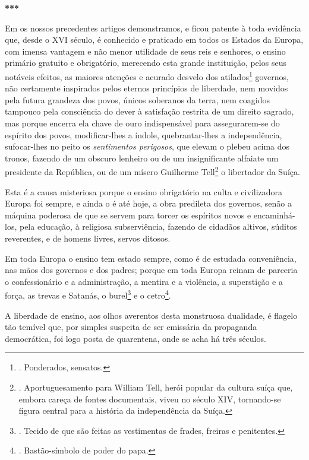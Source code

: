 \textbf{***}

Em os nossos precedentes artigos demonstramos, e ficou patente à toda
evidência que, desde o XVI século, é conhecido e praticado em todos os
Estados da Europa, com imensa vantagem e não menor utilidade de seus
reis e senhores, o ensino primário gratuito e obrigatório, merecendo
esta grande instituição, pelos seus notáveis efeitos, as maiores
atenções e acurado desvelo dos atilados\footnote{. Ponderados, sensatos.}
governos, não certamente inspirados pelos eternos princípios de
liberdade, nem movidos pela futura grandeza dos povos, únicos soberanos
da terra, nem coagidos tampouco pela consciência do dever à satisfação
restrita de um direito sagrado, mas porque encerra ela chave de ouro
indispensável para assegurarem-se do espírito dos povos, modificar-lhes
a índole, quebrantar-lhes a independência, sufocar-lhes no peito os
\emph{sentimentos perigosos}, que elevam o plebeu acima dos tronos,
fazendo de um obscuro lenheiro ou de um insignificante alfaiate um
presidente da República, ou de um mísero Guilherme Tell\footnote{.
  Aportuguesamento para William Tell, herói popular da cultura suíça
  que, embora careça de fontes documentais, viveu no século XIV,
  tornando-se figura central para a história da independência da Suíça.}
o libertador da Suíça.

Esta é a causa misteriosa porque o ensino obrigatório na culta e
civilizadora Europa foi sempre, e ainda o é até hoje, a obra predileta
dos governos, senão a máquina poderosa de que se servem para torcer os
espíritos novos e encaminhá-los, pela educação, à religiosa
subserviência, fazendo de cidadãos altivos, súditos reverentes, e de
homens livres, servos ditosos.

Em toda Europa o ensino tem estado sempre, como é de estudada
conveniência, nas mãos dos governos e dos padres; porque em toda Europa
reinam de parceria o confessionário e a administração, a mentira e a
violência, a superstição e a força, as trevas e Satanás, o
burel\footnote{. Tecido de que são feitas as vestimentas de frades,
  freiras e penitentes.} e o cetro\footnote{. Bastão-símbolo de poder do
  papa.}.

A liberdade de ensino, aos olhos averentos desta monstruosa dualidade, é
flagelo tão temível que, por simples suspeita de ser emissária da
propaganda democrática, foi logo posta de quarentena, onde se acha há
três séculos.

